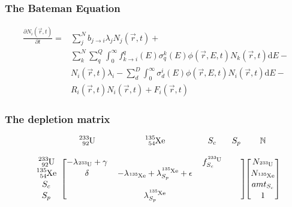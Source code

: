 \documentclass{beamer}
\begin{document}
\begin{frame}
\frametitle{The Bateman Equation}

    \begin{equation}
    \begin{split}
        \frac{\partial N_{i}(\vec{r},t)}{\partial t} = & \sum \limits_{j}^{N} 
        b_{j \rightarrow i} \lambda_{j} N_{j}(\vec{r}, t) + \\
        & \sum \limits_{k}^{N}
        \sum \limits_{q}^{Q} \int_{0}^{\infty} f_{k \rightarrow i}^{q}(E)
        \sigma_{q}^{k}(E) \phi(\vec{r},E,t) N_{k}(\vec{r},t)\mathrm{d}E - \\
        & N_{i}(\vec{r},t) \lambda_{i} - \sum \limits_{d}^{D} \int_{0}^{\infty}
        \sigma_{d}^{i}(E) \phi(\vec{r},E,t) N_{i}(\vec{r},t)\mathrm{d}E - \\
        & R_{i}(\vec{r},t) N_{i}(\vec{r},t) + F_{i}(\vec{r},t)
    \end{split}
    \end{equation}

\end{frame}

\begin{frame}
\frametitle{The depletion matrix}

    \begin{equation*}
        \begin{blockarray}{cccccc}
             &
            \ce{^{233}_{92}U} &
            \ce{^{135}_{54}Xe} &
            S_{c} &
            S_{p} &
            \mathbb{N} \\
             &
             &
             &
             &
             &
             \\ 
        \begin{block}{c[cccc][c]}
            \ce{^{233}_{92}U} &
            -\lambda_{\ce{^{233}U}} + \gamma &
             &
            f_{S_{c}}^{\ce{^{233}U}} &
             &
            N_{\ce{^{233}U}} \\
            \ce{^{135}_{54}Xe} &
            \delta &
            -\lambda_{\ce{^{135}Xe}} + \lambda_{S_{p}}^{\ce{^{135}Xe}} +
                \epsilon &
             &
             &
            N_{\ce{^{135}Xe}} \\
            S_{c} &
             &
             &
             &
             &
            amt_{S_{c}} \\
            S_{p} &
             &
            \lambda_{S_{p}}^{\ce{^{135}Xe}} &
             &
             &
             1\\
        \end{block}
        \end{blockarray}
    \end{equation*}

\end{frame}
\end{document}

